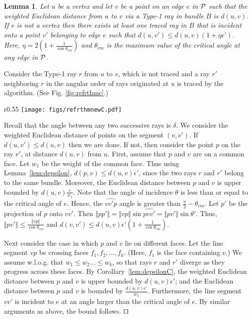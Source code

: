 \documentclass[11pt]{article}
\def\qed{\hbox{\rlap{$\sqcap$}$\sqcup$}}
\newtheorem{lemma}{Lemma}[section]
\newenvironment{proof}{\par\noindent{\bf Proof:}}{\mbox{}\hfill$\qed$\\}
\newcommand{\ignore}[1]{ }
\begin{document}
\begin{lemma}
\label{lem:errorX}
Let $u$ be a vertex and let $v$ be a point on an edge $e$ in $\cal{P}$ such that the weighted Euclidean distance from $u$ to $v$ via a Type-1 ray in  bundle $B$ is $d(u,v)$.
If $v$ is not a vertex then there exists at least one traced ray in $B$ that is incident onto a point $v'$ belonging to edge $e$ such that $d(u,v') \leq d(u,v)(1+ \eta \epsilon')$. 
Here, $\eta= 2(1+ \frac{1}{\cos{\theta_{cm}}})$ and $\theta_{cm}$ is the maximum value of the critical angle at any edge in $\cal{P}$. 
\end{lemma}

\begin{proof}
Consider the Type-1 ray $r$ from $u$ to $v$, which is not traced and a ray $r'$ neighboring $r$ in the angular order of rays originated at $u$ is traced by the algorithm. 
(See Fig. \ref{fig:refrthmc}.)

\begin{wrapfigure}{r}{0.55\textwidth}
\centering
\texttt{[image: figs/refrthmnewC.pdf]}
\caption{\footnotesize Illustrating the construction in proving the Lemma \ref{lem:errorX} }
\label{fig:refrthmc}
\end{wrapfigure}

\ignore {
\begin{center}
\texttt{[image: figs/refrthmnewCb.pdf]}
}

Recall that the angle between any two successive rays is $\delta$. 
We consider the weighted Euclidean distance of points on the segment $(v,v')$.
If $d(u,v') \leq d(u,v)$ then we are done.
If not, then  consider the point $p$ on the ray $ r'$,  at distance $d(u,v)$ from $u$.
First, assume that $p$ and $v$ are on a common face. 
Let $w_1$ be the weight of the common face.
Thus using Lemma~\ref{lem:depsilon},  $d(p,v) \leq d(u,v) \epsilon'$, since the two rays $r$ and $r'$ belong to the same bundle. Moreover,
the Euclidean distance between $p$ and $v$ is upper bounded by $d(u,v)\frac{\epsilon}{w_1}$.
Note that the angle of incidence $\theta$ is less than or equal to the critical angle of $e$. 
Hence, the $\widehat{vv'p}$ angle is greater than $\frac{\pi}{2}-\theta_{cm}$.
Let $p'$ be the projection of $p$ onto $\overline{vv'}$.
Then $\Vert pp' \Vert = \Vert vp \Vert \sin{\widehat{pvv'}} = \Vert pv' \Vert \sin \theta'$.
Thus, $\Vert pv' \Vert \leq \frac{\Vert vp \Vert}{\cos{\theta_{cm}} }$
and 
$d(v,v') \leq d(u,v) \epsilon'(1+\frac{1}{\cos{\theta_{cm}}} )$.

Next consider the case in which $p$ and $v$ lie on different faces. 
Let the line segment $vp$ be crossing faces $f_1, f_2, \ldots, f_k$.
(Here, $f_1$ is the face containing $v$.)
We assume w.l.o.g. that $w_1 \leq w_2 \ldots \leq w_k$, so that rays $r$ and $r'$ diverge as they progress across these faces.
By Corollary~\ref{lem:depsilonC}, the weighted Euclidean distance between $p$ and $v$ is upper bounded by $d(u,v)\epsilon'$;
and the Euclidean distance between $p$ and $v$ is bounded by $\frac{d(u,v)\epsilon'}{w_1}$. 
Furthermore, the line segment $vv'$ is incident to $e$ at an angle larger than the critical angle of $e$. 
By similar arguments as above, the bound follows.
\end{proof}
\end{document}
